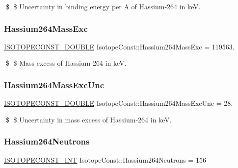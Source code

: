 \$ \$ Uncertainty in binding energy per A of Hassium-\/264 in keV. \mbox{\label{group___isotope_const-_hassium-_hs264_gaf616c57a5d18a69c95008e94c839b61e}} 
\subsubsection{\texorpdfstring{Hassium264\+Mass\+Exc}{Hassium264MassExc}}
{\footnotesize\ttfamily \mbox{\hyperlink{group___isotope_const-_macros_ga8f45a7272ce02c0b4c65c44636ed719a}{I\+S\+O\+T\+O\+P\+E\+C\+O\+N\+S\+T\+\_\+\+D\+O\+U\+B\+LE}} Isotope\+Const\+::\+Hassium264\+Mass\+Exc = 119563.}

\$ \$ Mass excess of Hassium-\/264 in keV. \mbox{\label{group___isotope_const-_hassium-_hs264_ga8f2365fdb74a58716625129fc9b1152c}} 
\subsubsection{\texorpdfstring{Hassium264\+Mass\+Exc\+Unc}{Hassium264MassExcUnc}}
{\footnotesize\ttfamily \mbox{\hyperlink{group___isotope_const-_macros_ga8f45a7272ce02c0b4c65c44636ed719a}{I\+S\+O\+T\+O\+P\+E\+C\+O\+N\+S\+T\+\_\+\+D\+O\+U\+B\+LE}} Isotope\+Const\+::\+Hassium264\+Mass\+Exc\+Unc = 28.}

\$ \$ Uncertainty in mass excess of Hassium-\/264 in keV. \mbox{\label{group___isotope_const-_hassium-_hs264_gac249d2a06ae22706ed45d634cddeb134}} 
\subsubsection{\texorpdfstring{Hassium264\+Neutrons}{Hassium264Neutrons}}
{\footnotesize\ttfamily \mbox{\hyperlink{group___isotope_const-_macros_ga5f18360b3e99483a35c32d789e62621c}{I\+S\+O\+T\+O\+P\+E\+C\+O\+N\+S\+T\+\_\+\+I\+NT}} Isotope\+Const\+::\+Hassium264\+Neutrons = 156}

